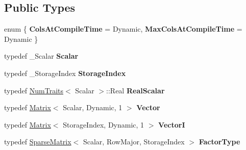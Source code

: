 \subsection*{Public Types}
\begin{DoxyCompactItemize}
\item 
\mbox{\label{class_eigen_1_1_incomplete_l_u_t_a5a577d38bced763eec40147600b8d066}} 
enum \{ {\bfseries Cols\+At\+Compile\+Time} = Dynamic, 
{\bfseries Max\+Cols\+At\+Compile\+Time} = Dynamic
 \}
\item 
\mbox{\label{class_eigen_1_1_incomplete_l_u_t_a0fccc61fbac750e7c93b057ce9138ab6}} 
typedef \+\_\+\+Scalar {\bfseries Scalar}
\item 
\mbox{\label{class_eigen_1_1_incomplete_l_u_t_a0328a3350d85b887b181307daf6077b0}} 
typedef \+\_\+\+Storage\+Index {\bfseries Storage\+Index}
\item 
\mbox{\label{class_eigen_1_1_incomplete_l_u_t_aea29f35fea823506e756edc5456a4dd4}} 
typedef \mbox{\hyperlink{struct_eigen_1_1_num_traits}{Num\+Traits}}$<$ Scalar $>$\+::Real {\bfseries Real\+Scalar}
\item 
\mbox{\label{class_eigen_1_1_incomplete_l_u_t_ac864c5ba2a5b4084115aa213b17f124e}} 
typedef \mbox{\hyperlink{class_eigen_1_1_matrix}{Matrix}}$<$ Scalar, Dynamic, 1 $>$ {\bfseries Vector}
\item 
\mbox{\label{class_eigen_1_1_incomplete_l_u_t_a089c91827dd35ccc324aef94080edf6c}} 
typedef \mbox{\hyperlink{class_eigen_1_1_matrix}{Matrix}}$<$ Storage\+Index, Dynamic, 1 $>$ {\bfseries VectorI}
\item 
\mbox{\label{class_eigen_1_1_incomplete_l_u_t_a82aa21e844c421b20d94ad651a62cfe7}} 
typedef \mbox{\hyperlink{class_eigen_1_1_sparse_matrix}{Sparse\+Matrix}}$<$ Scalar, Row\+Major, Storage\+Index $>$ {\bfseries Factor\+Type}
\end{DoxyCompactItemize}
